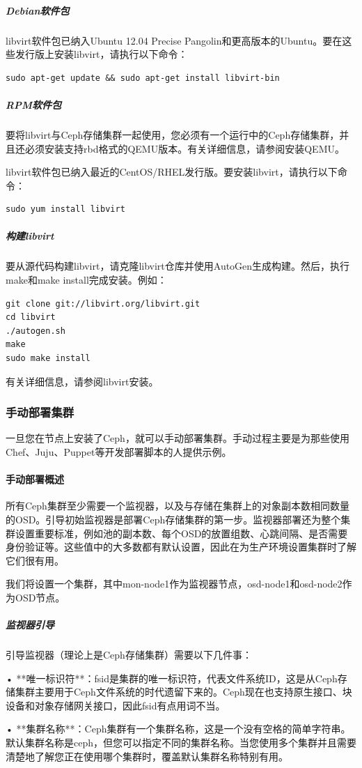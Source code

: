 \documentclass[12pt,UTF8]{ctexbook}
\begin{document}
\subparagraph{Debian软件包}
libvirt软件包已纳入Ubuntu 12.04 Precise Pangolin和更高版本的Ubuntu。要在这些发行版上安装libvirt，请执行以下命令：
\begin{verbatim}
sudo apt-get update && sudo apt-get install libvirt-bin
\end{verbatim}

\subparagraph{RPM软件包}
要将libvirt与Ceph存储集群一起使用，您必须有一个运行中的Ceph存储集群，并且还必须安装支持rbd格式的QEMU版本。有关详细信息，请参阅安装QEMU。

libvirt软件包已纳入最近的CentOS/RHEL发行版。要安装libvirt，请执行以下命令：
\begin{verbatim}
sudo yum install libvirt
\end{verbatim}

\subparagraph{构建libvirt}
要从源代码构建libvirt，请克隆libvirt仓库并使用AutoGen生成构建。然后，执行make和make install完成安装。例如：
\begin{verbatim}
git clone git://libvirt.org/libvirt.git
cd libvirt
./autogen.sh
make
sudo make install
\end{verbatim}

有关详细信息，请参阅libvirt安装。

\subsubsection{手动部署集群}
一旦您在节点上安装了Ceph，就可以手动部署集群。手动过程主要是为那些使用Chef、Juju、Puppet等开发部署脚本的人提供示例。

\paragraph{手动部署概述}
所有Ceph集群至少需要一个监视器，以及与存储在集群上的对象副本数相同数量的OSD。引导初始监视器是部署Ceph存储集群的第一步。监视器部署还为整个集群设置重要标准，例如池的副本数、每个OSD的放置组数、心跳间隔、是否需要身份验证等。这些值中的大多数都有默认设置，因此在为生产环境设置集群时了解它们很有用。

我们将设置一个集群，其中mon-node1作为监视器节点，osd-node1和osd-node2作为OSD节点。

\subparagraph{监视器引导}
引导监视器（理论上是Ceph存储集群）需要以下几件事：

• **唯一标识符**：fsid是集群的唯一标识符，代表文件系统ID，这是从Ceph存储集群主要用于Ceph文件系统的时代遗留下来的。Ceph现在也支持原生接口、块设备和对象存储网关接口，因此fsid有点用词不当。

• **集群名称**：Ceph集群有一个集群名称，这是一个没有空格的简单字符串。默认集群名称是ceph，但您可以指定不同的集群名称。当您使用多个集群并且需要清楚地了解您正在使用哪个集群时，覆盖默认集群名称特别有用。
\end{document}
